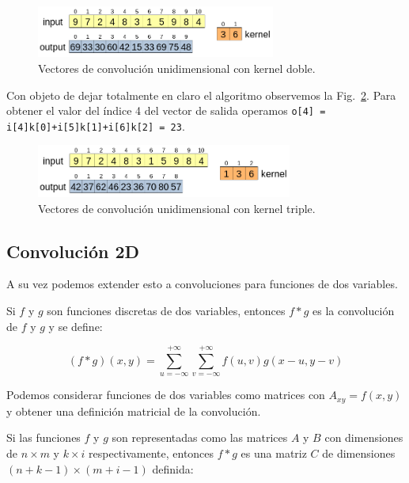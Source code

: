 \documentclass[a4paper,12pt]{article}
\begin{document}
\begin{figure}[H]
	\begin{center}				
		\includegraphics[width=0.7\textwidth]{tesis_25.png}
		\caption{Vectores de convolución unidimensional con kernel doble.}
		\label{fig:conv1dk2}
	\end{center}
\end{figure}

Con objeto de dejar totalmente en claro el algoritmo observemos la Fig.~\ref{fig:conv1dk3}. Para obtener el valor del índice 4 del vector de salida operamos \texttt{o[4] = i[4]k[0]+i[5]k[1]+i[6]k[2] = 23}.

\begin{figure}[H]
	\begin{center}				
		\includegraphics[width=0.75\textwidth]{tesis_26.png}
		\caption{Vectores de convolución unidimensional con kernel triple.}
		\label{fig:conv1dk3}
	\end{center}
\end{figure}

\subsection{Convolución 2D}

A su vez podemos extender esto a convoluciones para funciones de dos variables.

Si $f$ y $g$ son funciones discretas de dos variables, entonces $f*g$ es la convolución de $f$ y $g$ y se define:

$$
(f*g)(x,y) = \sum_{u=-\infty}^{+\infty} \sum_{v=-\infty}^{+\infty} f(u,v)g(x-u,y-v)
$$

Podemos considerar funciones de dos variables como matrices con $A_{xy} = f(x,y)$ y obtener una definición matricial de la convolución.

Si las funciones $f$ y $g$ son representadas como las matrices $A$ y $B$ con dimensiones de $n \times m$ y $k \times i$ respectivamente, entonces $f*g$ es una matriz $C$ de dimensiones $(n+k-1) \times (m+i-1)$ definida:
\end{document}
